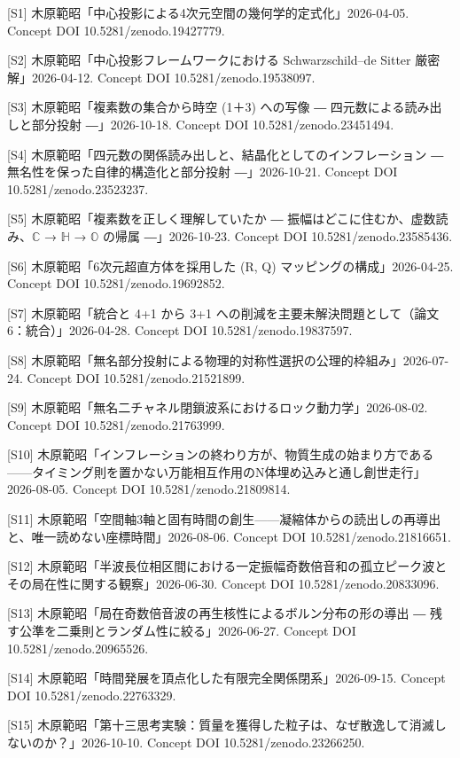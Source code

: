 \documentclass[
  a4paper,
]{ltjsarticle}
\begin{document}
{[}S1{]} 木原範昭「中心投影による4次元空間の幾何学的定式化」2026-04-05.
Concept DOI 10.5281/zenodo.19427779.

{[}S2{]} 木原範昭「中心投影フレームワークにおける Schwarzschild--de
Sitter 厳密解」2026-04-12. Concept DOI 10.5281/zenodo.19538097.

{[}S3{]} 木原範昭「複素数の集合から時空 (1＋3) への写像 ―
四元数による読み出しと部分投射 ―」2026-10-18. Concept DOI
10.5281/zenodo.23451494.

{[}S4{]}
木原範昭「四元数の関係読み出しと、結晶化としてのインフレーション ―
無名性を保った自律的構造化と部分投射 ―」2026-10-21. Concept DOI
10.5281/zenodo.23523237.

{[}S5{]} 木原範昭「複素数を正しく理解していたか ―
振幅はどこに住むか、虚数読み、\(\mathbb{C}\) → \(\mathbb{H}\) →
\(\mathbb{O}\) の帰属 ―」2026-10-23. Concept DOI
10.5281/zenodo.23585436.

{[}S6{]} 木原範昭「6次元超直方体を採用した (R, Q)
マッピングの構成」2026-04-25. Concept DOI 10.5281/zenodo.19692852.

{[}S7{]} 木原範昭「統合と 4+1 から 3+1
への削減を主要未解決問題として（論文6：統合）」2026-04-28. Concept DOI
10.5281/zenodo.19837597.

{[}S8{]}
木原範昭「無名部分投射による物理的対称性選択の公理的枠組み」2026-07-24.
Concept DOI 10.5281/zenodo.21521899.

{[}S9{]}
木原範昭「無名二チャネル閉鎖波系におけるロック動力学」2026-08-02.
Concept DOI 10.5281/zenodo.21763999.

{[}S10{]}
木原範昭「インフレーションの終わり方が、物質生成の始まり方である------タイミング則を置かない万能相互作用のN体埋め込みと通し創世走行」2026-08-05.
Concept DOI 10.5281/zenodo.21809814.

{[}S11{]}
木原範昭「空間軸3軸と固有時間の創生------凝縮体からの読出しの再導出と、唯一読めない座標時間」2026-08-06.
Concept DOI 10.5281/zenodo.21816651.

{[}S12{]}
木原範昭「半波長位相区間における一定振幅奇数倍音和の孤立ピーク波とその局在性に関する観察」2026-06-30.
Concept DOI 10.5281/zenodo.20833096.

{[}S13{]} 木原範昭「局在奇数倍音波の再生核性によるボルン分布の形の導出 ―
残す公準を二乗則とランダム性に絞る」2026-06-27. Concept DOI
10.5281/zenodo.20965526.

{[}S14{]} 木原範昭「時間発展を頂点化した有限完全関係閉系」2026-09-15.
Concept DOI 10.5281/zenodo.22763329.

{[}S15{]}
木原範昭「第十三思考実験：質量を獲得した粒子は、なぜ散逸して消滅しないのか？」2026-10-10.
Concept DOI 10.5281/zenodo.23266250.
\end{document}
